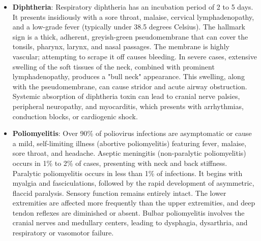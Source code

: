 \begin{itemize}
    \item \textbf{Diphtheria}: Respiratory diphtheria has an incubation period of 2 to 5 days. It presents insidiously with a sore throat, malaise, cervical lymphadenopathy, and a low-grade fever (typically under 38.5 degrees Celsius). The hallmark sign is a thick, adherent, greyish-green pseudomembrane that can cover the tonsils, pharynx, larynx, and nasal passages. The membrane is highly vascular; attempting to scrape it off causes bleeding. In severe cases, extensive swelling of the soft tissues of the neck, combined with prominent lymphadenopathy, produces a "bull neck" appearance. This swelling, along with the pseudomembrane, can cause stridor and acute airway obstruction. Systemic absorption of diphtheria toxin can lead to cranial nerve palsies, peripheral neuropathy, and myocarditis, which presents with arrhythmias, conduction blocks, or cardiogenic shock.
    \item \textbf{Poliomyelitis}: Over 90\% of poliovirus infections are asymptomatic or cause a mild, self-limiting illness (abortive poliomyelitis) featuring fever, malaise, sore throat, and headache. Aseptic meningitis (non-paralytic poliomyelitis) occurs in 1\% to 2\% of cases, presenting with neck and back stiffness. Paralytic poliomyelitis occurs in less than 1\% of infections. It begins with myalgia and fasciculations, followed by the rapid development of asymmetric, flaccid paralysis. Sensory function remains entirely intact. The lower extremities are affected more frequently than the upper extremities, and deep tendon reflexes are diminished or absent. Bulbar poliomyelitis involves the cranial nerves and medullary centers, leading to dysphagia, dysarthria, and respiratory or vasomotor failure.
\end{itemize}

